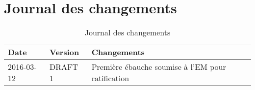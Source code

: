 \thispagestyle{default}



\section*{Journal des changements}

\begin{table}[h]

    \centering

    \begin{tabularx}{\textwidth}{ @{} p{3cm} p{3cm} X @{} }

        \textbf{Date} & \textbf{Version} & \textbf{Changements}\\ \toprule

    	2016-03-12 & DRAFT 1 & Première ébauche soumise à l'EM pour ratification\\ \midrule
    	
    	
    	\bottomrule
    	

    \end{tabularx}

    \caption[Changements]{Journal des changements}

    \label{record-of-changes}

\end{table} 